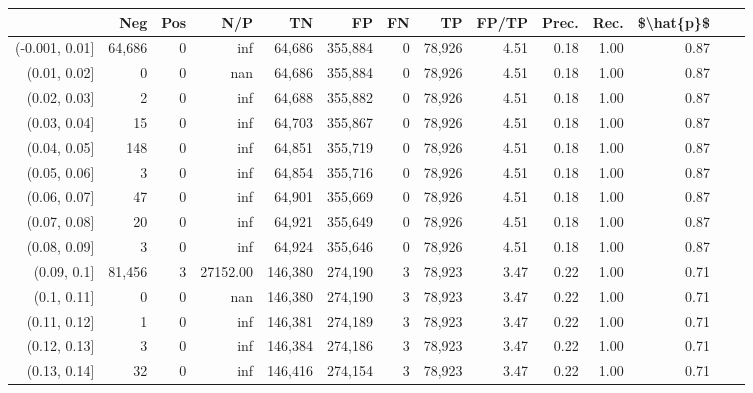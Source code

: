 \begin{tabular}{rrrrrrrrrrrrrr}
\toprule
{} &     Neg &     Pos &       N/P &       TN &       FP &      FN &      TP & FP/TP & Prec. &  Rec. & \$\textbackslash hat\{p\}\$ \\
\midrule
(-0.001, 0.01] &  64,686 &       0 &       inf &   64,686 &  355,884 &       0 &  78,926 &  4.51 &  0.18 &  1.00 &      0.87 \\
(0.01, 0.02]   &       0 &       0 &       nan &   64,686 &  355,884 &       0 &  78,926 &  4.51 &  0.18 &  1.00 &      0.87 \\
(0.02, 0.03]   &       2 &       0 &       inf &   64,688 &  355,882 &       0 &  78,926 &  4.51 &  0.18 &  1.00 &      0.87 \\
(0.03, 0.04]   &      15 &       0 &       inf &   64,703 &  355,867 &       0 &  78,926 &  4.51 &  0.18 &  1.00 &      0.87 \\
(0.04, 0.05]   &     148 &       0 &       inf &   64,851 &  355,719 &       0 &  78,926 &  4.51 &  0.18 &  1.00 &      0.87 \\
(0.05, 0.06]   &       3 &       0 &       inf &   64,854 &  355,716 &       0 &  78,926 &  4.51 &  0.18 &  1.00 &      0.87 \\
(0.06, 0.07]   &      47 &       0 &       inf &   64,901 &  355,669 &       0 &  78,926 &  4.51 &  0.18 &  1.00 &      0.87 \\
(0.07, 0.08]   &      20 &       0 &       inf &   64,921 &  355,649 &       0 &  78,926 &  4.51 &  0.18 &  1.00 &      0.87 \\
(0.08, 0.09]   &       3 &       0 &       inf &   64,924 &  355,646 &       0 &  78,926 &  4.51 &  0.18 &  1.00 &      0.87 \\
(0.09, 0.1]    &  81,456 &       3 &  27152.00 &  146,380 &  274,190 &       3 &  78,923 &  3.47 &  0.22 &  1.00 &      0.71 \\
(0.1, 0.11]    &       0 &       0 &       nan &  146,380 &  274,190 &       3 &  78,923 &  3.47 &  0.22 &  1.00 &      0.71 \\
(0.11, 0.12]   &       1 &       0 &       inf &  146,381 &  274,189 &       3 &  78,923 &  3.47 &  0.22 &  1.00 &      0.71 \\
(0.12, 0.13]   &       3 &       0 &       inf &  146,384 &  274,186 &       3 &  78,923 &  3.47 &  0.22 &  1.00 &      0.71 \\
(0.13, 0.14]   &      32 &       0 &       inf &  146,416 &  274,154 &       3 &  78,923 &  3.47 &  0.22 &  1.00 &      0.71 \\

\end{tabular}
